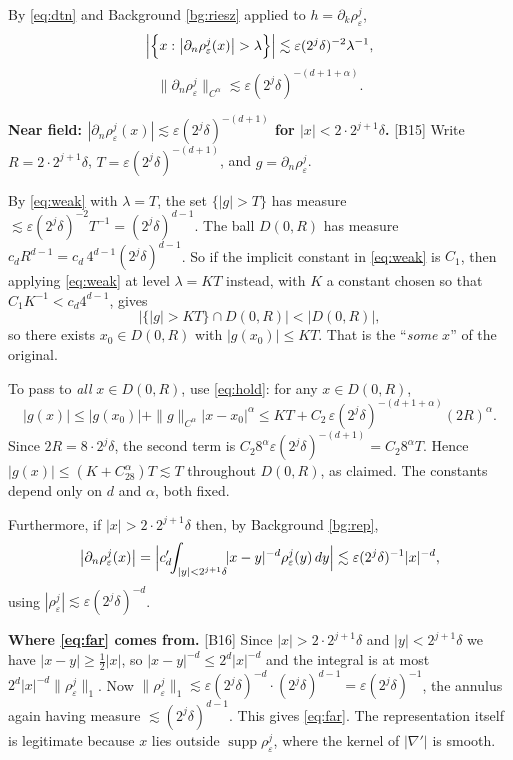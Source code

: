 \documentclass[11pt,reqno]{amsart}
\theoremstyle{plain}
\theoremstyle{definition}
\theoremstyle{plain}
\theoremstyle{definition}
\theoremstyle{remark}
\newcommand{\nd}{\partial_n}
\DeclareMathOperator{\supp}{supp}
\newcommand{\Ledger}[1]{{\scriptsize\textsf{[#1]}}}
\begin{document}
By \eqref{eq:dtn} and Background \ref{bg:riesz} applied to
$h=\partial_k\rho^j_\varepsilon$,
\begin{equation}\label{eq:weak}
  \Bigl|\Bigl\{x:\bigl|\nd\rho^j_\varepsilon(x)\bigr|>\lambda\Bigr\}\Bigr|
   \lesssim\varepsilon(2^j\delta)^{-2}\lambda^{-1},
\end{equation}
\begin{equation}\label{eq:hold}
  \bigl\|\nd\rho^j_\varepsilon\bigr\|_{C^\alpha}
   \lesssim\varepsilon(2^j\delta)^{-(d+1+\alpha)} .
\end{equation}

\begin{expansion}
\textbf{Near field: $|\nd\rho^j_\varepsilon(x)|\lesssim\varepsilon(2^j\delta)^{-(d+1)}$
for $|x|<2\cdot2^{j+1}\delta$.} \Ledger{B15} Write $R=2\cdot2^{j+1}\delta$,
$T=\varepsilon(2^j\delta)^{-(d+1)}$, and $g=\nd\rho^j_\varepsilon$.

By \eqref{eq:weak} with $\lambda=T$, the set $\{|g|>T\}$ has measure
$\lesssim\varepsilon(2^j\delta)^{-2}T^{-1}=(2^j\delta)^{d-1}$. The ball $D(0,R)$ has
measure $c_{d}R^{d-1}=c_d\,4^{d-1}(2^j\delta)^{d-1}$. So if the implicit constant in
\eqref{eq:weak} is $C_1$, then applying \eqref{eq:weak} at level $\lambda=KT$
instead, with $K$ a constant chosen so that $C_1K^{-1}<c_d4^{d-1}$, gives
\[|\{|g|>KT\}\cap D(0,R)|<|D(0,R)|,\]
so there exists $x_0\in D(0,R)$ with $|g(x_0)|\le KT$. That is the ``\emph{some} $x$''
of the original.

To pass to \emph{all} $x\in D(0,R)$, use \eqref{eq:hold}: for any $x\in D(0,R)$,
\[|g(x)|\le|g(x_0)|+\|g\|_{C^\alpha}|x-x_0|^\alpha
 \le KT+C_2\,\varepsilon(2^j\delta)^{-(d+1+\alpha)}(2R)^\alpha .\]
Since $2R=8\cdot2^j\delta$, the second term is
$C_2 8^\alpha\varepsilon(2^j\delta)^{-(d+1)}=C_2 8^\alpha T$. Hence
$|g(x)|\le(K+C_28^\alpha)T\lesssim T$ throughout $D(0,R)$, as claimed. The
constants depend only on $d$ and $\alpha$, both fixed.
\end{expansion}

Furthermore, if $|x|>2\cdot2^{j+1}\delta$ then, by Background \ref{bg:rep},
\begin{equation}\label{eq:far}
 \bigl|\nd\rho^j_\varepsilon(x)\bigr|
  =\Bigl|c_d'\!\!\int_{|y|<2^{j+1}\delta}\!\!|x-y|^{-d}\rho^j_\varepsilon(y)\,dy\Bigr|
  \lesssim\varepsilon(2^j\delta)^{-1}|x|^{-d},
\end{equation}
using $|\rho^j_\varepsilon|\lesssim\varepsilon(2^j\delta)^{-d}$.

\begin{expansion}
\textbf{Where \eqref{eq:far} comes from.} \Ledger{B16} Since
$|x|>2\cdot2^{j+1}\delta$ and $|y|<2^{j+1}\delta$ we have $|x-y|\ge\frac12|x|$, so
$|x-y|^{-d}\le2^d|x|^{-d}$ and the integral is at most
$2^d|x|^{-d}\|\rho^j_\varepsilon\|_1$. Now
$\|\rho^j_\varepsilon\|_1\lesssim\varepsilon(2^j\delta)^{-d}\cdot(2^j\delta)^{d-1}
 =\varepsilon(2^j\delta)^{-1}$, the annulus again having measure
$\lesssim(2^j\delta)^{d-1}$. This gives \eqref{eq:far}. The representation itself is
legitimate because $x$ lies outside $\supp\rho^j_\varepsilon$, where the kernel of
$|\nabla'|$ is smooth.
\end{expansion}
\end{document}
